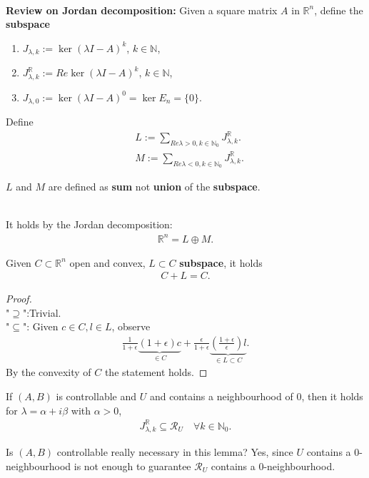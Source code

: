 \quad\\
\textbf{Review on Jordan decomposition:}
Given a square matrix $A$ in $\mathbb{R}^n$, define the \textbf{subspace}
\begin{enumerate}
	\item $J_{\lambda, k}:= \ker (\lambda I - A)^k $, $k \in \mathbb{N}$,
	\item $J_{\lambda, k}^\mathbb{R} := Re \ker (\lambda I - A)^k$, $k \in \mathbb{N}$, 
	\item $J_{\lambda, 0}:= \ker (\lambda I - A)^0 = \ker E_n = \{0\}. $
\end{enumerate}
Define 
\begin{align*}
	& L:= \sum_{ Re\lambda > 0, k \in \mathbb{N}_0} J_{\lambda, k}^{\mathbb{R}}.\\
	& M:= \sum_{ Re\lambda < 0, k \in \mathbb{N}_0} J_{\lambda, k}^{\mathbb{R}}.
\end{align*}
\begin{remark}
$L$ and $M$ are defined as \textbf{sum} not \textbf{union} of the \textbf{subspace}.	
\end{remark}

\quad\\
It holds by the Jordan decomposition: 
\begin{align*}
	\mathbb{R}^n = L \oplus M. 
\end{align*}

\begin{lemma}[]
	Given $C \subset \mathbb{R}^n$ open and convex, $L \subset C$ \textbf{subspace}, it holds
	\begin{align*}
		C + L = C. 
	\end{align*}
\end{lemma}
\begin{proof}
\quad\\
"$\supseteq$":Trivial. \\
"$\subseteq$": Given $c \in C, l \in L$, observe
\begin{align*}
	\frac{1}{1 + \epsilon} \underbrace{ (1 + \epsilon) c}_{\in C  } + \frac{\epsilon}{1 + \epsilon} \underbrace{(\frac{1 + \epsilon}{\epsilon})l}_{ \in L \subset C } . 
\end{align*}
By the convexity of $C$ the statement holds.
\end{proof}


\begin{lemma}
	If $(A, B)$ is controllable and $U$  and contains a neighbourhood of $0$, then it holds for $\lambda = \alpha + i \beta$ with $\alpha > 0$,
	\begin{align*}
		J_{\lambda, k}^{\mathbb{R}} \subseteq \mathcal{R}_U \quad \forall k \in \mathbb{N}_0.
	\end{align*}
\end{lemma}
\begin{remark}
Is $(A, B)$ controllable really necessary in this lemma? Yes, since $U$ contains a 0-neighbourhood is not enough to guarantee $\mathcal{R}_U$ contains a 0-neighbourhood.  	
\end{remark}

